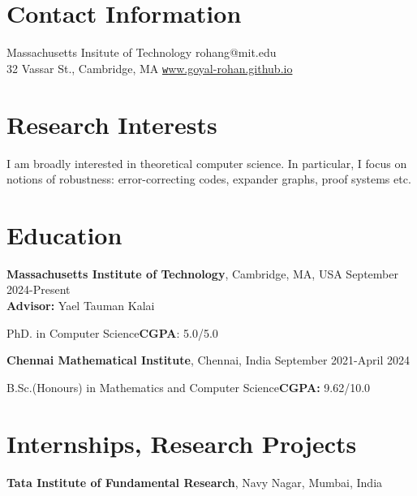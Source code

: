 \documentclass[margin,line, 10pt]{res}
\begin{document}

\begin{resume}
\section{\sc Contact Information}
Massachusetts Insitute of Technology \hfill {rohan\textunderscore g@mit.edu}\\
32 Vassar St., Cambridge, MA \hfill \href{https://goyal-rohan.github.io/}{\texttt www.goyal-rohan.github.io}

\section{\sc Research Interests}
I am broadly interested in theoretical computer science. In particular, I focus on notions of robustness: error-correcting codes, expander graphs, proof systems etc.
\section{\sc Education}


{\bf Massachusetts Institute of Technology}, Cambridge, MA, USA \hfill September 2024-Present\\
{\bf Advisor:} Yael Tauman Kalai

\vspace{-0.4cm}
PhD. in Computer Science\hfill {\bf CGPA}: 5.0/5.0



{\bf Chennai Mathematical Institute}, Chennai, India \hfill September 2021-April 2024

\vspace{-0.4cm}
B.Sc.(Honours) in Mathematics and Computer Science{\hfill{\bf CGPA:} 9.62/10.0}




\section{\sc Internships, Research Projects}
{\bf Tata Institute of Fundamental Research}, Navy Nagar, Mumbai, India


\end{resume}
\end{document}
